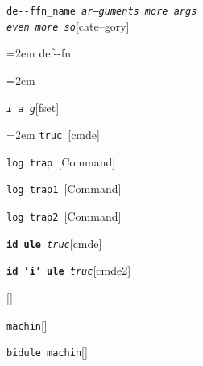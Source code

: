 \documentclass{book}
\begin{document}
\endgroup{}%
\noindent\texttt{de{-}{-}ffn\_name \bgroup{}\normalfont{}\textsl{ar--guments    more args \leavevmode{}\\ even more so}\egroup{}}\hfill[cate--gory]



%
\par\begingroup\obeylines\obeyspaces\frenchspacing\leftskip=2em\relax\parskip=0pt\relax\ttfamily{}%
def{-}{-}fn
\endgroup{}%
\par\begingroup\obeylines\obeyspaces\frenchspacing\leftskip=2em\relax\parskip=0pt\relax\ttfamily{}%

\endgroup{}%
\noindent\texttt{\textsl{i} \bgroup{}\normalfont{}\textsl{a g}\egroup{}}\hfill[fset]



%
\par\begingroup\obeylines\obeyspaces\frenchspacing\leftskip=2em\relax\parskip=0pt\relax\ttfamily{}%
%
\endgroup{}%
\noindent\texttt{truc \bgroup{}\normalfont{}\textsl{}\egroup{}}\hfill[cmde]



%
\noindent\texttt{log trap \bgroup{}\normalfont{}\textsl{}\egroup{}}\hfill[Command]



%
\noindent\texttt{log trap1 \bgroup{}\normalfont{}\textsl{}\egroup{}}\hfill[Command]



%
\noindent\texttt{log trap2 \bgroup{}\normalfont{}\textsl{}\egroup{}}\hfill[Command]



%
\noindent\texttt{\textbf{id ule} \bgroup{}\normalfont{}\textsl{truc}\egroup{}}\hfill[cmde]



%
\noindent\texttt{\textbf{id `\texttt{i}' ule} \bgroup{}\normalfont{}\textsl{truc}\egroup{}}\hfill[cmde2]



%
\noindent\texttt{}\hfill[]



\noindent\texttt{machin}\hfill[]



%
\noindent\texttt{bidule machin}\hfill[]
\end{document}
